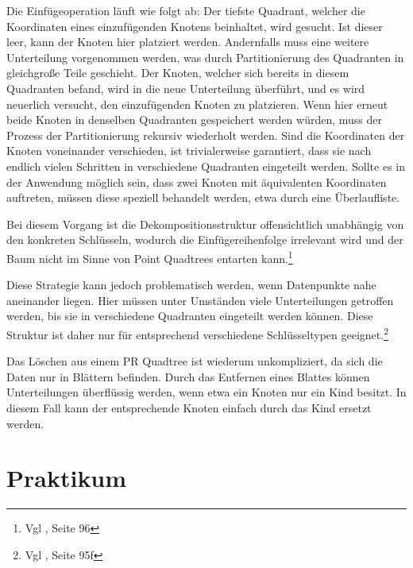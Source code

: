 \documentclass[%
			paper=a4,%
			DIV12,
			liststotoc,
			bibtotoc,
			draft=false,%
			titlepage,
			numbers=noendperiod
			]{scrartcl}
\newcommand{\zit}[3]{#1 \cite{#2}, #3}
\newcommand{\footzit}[3]{\footnote{\zit{#1}{#2}{#3}}}
\begin{document}
Die Einfügeoperation läuft wie folgt ab:
Der tiefste Quadrant, welcher die Koordinaten eines einzufügenden Knotens beinhaltet, wird gesucht.
Ist dieser leer, kann der Knoten hier platziert werden.
Andernfalls muss eine weitere Unterteilung vorgenommen werden, was durch Partitionierung des Quadranten in gleichgroße Teile geschieht. 
Der Knoten, welcher sich bereits in diesem Quadranten befand, wird in die neue Unterteilung überführt, und es wird neuerlich versucht, den einzufügenden Knoten zu platzieren. 
Wenn hier erneut beide Knoten in denselben Quadranten gespeichert werden würden, muss der Prozess der Partitionierung rekursiv wiederholt werden.
Sind die Koordinaten der Knoten voneinander verschieden, ist trivialerweise garantiert, dass sie nach endlich vielen Schritten in verschiedene Quadranten eingeteilt werden. 
Sollte es in der Anwendung möglich sein, dass zwei Knoten mit äquivalenten Koordinaten auftreten, müssen diese speziell behandelt werden, etwa durch eine Überlaufliste.


Bei diesem Vorgang ist die Dekompositionsstruktur offensichtlich unabhängig von den konkreten Schlüsseln, wodurch die Einfügereihenfolge irrelevant wird und der Baum nicht im Sinne von Point Quadtrees entarten kann.\footzit{Vgl}{Samet90}{Seite 96}

Diese Strategie kann jedoch problematisch werden, wenn Datenpunkte nahe aneinander liegen.
Hier müssen unter Umständen viele Unterteilungen getroffen werden, bis sie in verschiedene Quadranten eingeteilt werden können. 
Diese Struktur ist daher nur für entsprechend verschiedene Schlüsseltypen geeignet.\footzit{Vgl}{Samet90}{Seite 95f}

Das Löschen aus einem PR Quadtree ist wiederum unkompliziert, da sich die Daten nur in Blättern befinden.
Durch das Entfernen eines Blattes können Unterteilungen überflüssig werden, wenn etwa ein Knoten nur ein Kind besitzt.
In diesem Fall kann der entsprechende Knoten einfach durch das Kind ersetzt werden.

\newpage
\part{Praktikum}
\end{document}

